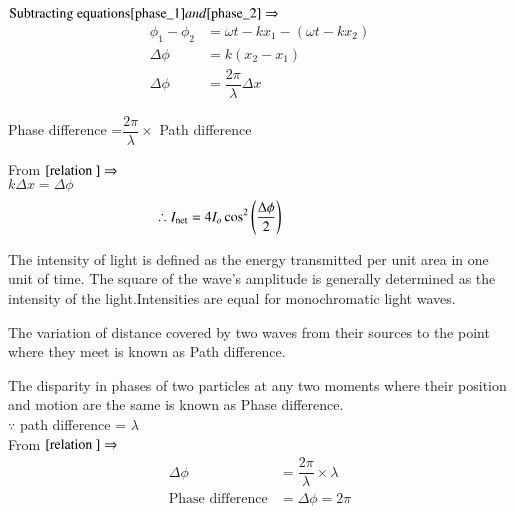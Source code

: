 \documentclass[journal,12pt,twocolumn]{IEEEtran}
\theoremstyle{remark}
\begin{document}
$ \text{Subtracting equations} \eqref{phase_1} and \eqref{phase_2} \Rightarrow{}$
\begin{align}
   \phi_1 - \phi_2 &= \omega t - kx_1 -( \omega t - kx_2 ) \nonumber \\ 
   \Delta \phi &= k(x_2 - x_1) \nonumber \\ 
    \Delta \phi &= \dfrac{2\pi}{\lambda}\Delta x  \label{relation }
\end{align}

\hspace{0.3cm} Phase difference =$\dfrac{2\pi}{\lambda} \times$ Path difference

From  $\eqref{relation } \Rightarrow $ \\
  \hspace*{2.5cm} $k\Delta x = \Delta \phi$  
\begin{align} \hspace*{-2cm}
\therefore I_\text{net} = 4I_o\cos^2\left(\dfrac{\Delta \phi}{2}\right) \label{intensity}
\end{align}

The intensity of light is defined as the energy transmitted per unit area in one unit of time. The square of the wave's amplitude is generally determined as the intensity of the light.Intensities are equal for monochromatic light waves.\\

\vspace{0.2cm}

The variation of distance covered by two waves from their sources to the point where they meet is known as Path difference.

The disparity in phases of two particles at any two moments where their position and motion are the same is known as Phase difference. \\

$\because$ path difference = $\lambda$ \\
\hspace*{0.4cm}From $\eqref{relation } \Rightarrow$
\begin{align}
\Delta \phi &= \dfrac{2\pi}{\lambda}  \times \lambda \nonumber \\
\text{Phase difference} &= \Delta \phi = 2\pi
\end{align}
\end{document}
